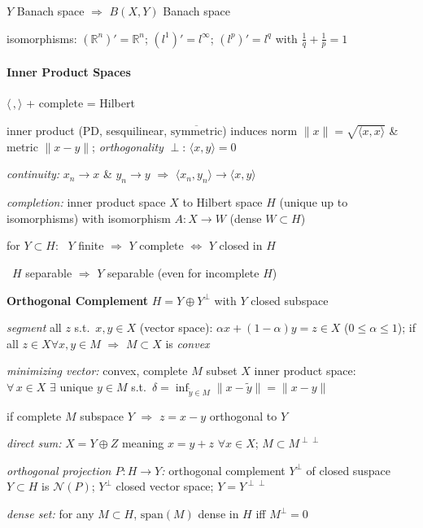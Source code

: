 \documentclass[8pt,twoside]{extarticle}
\begin{document}
\begin{multicols}{2}
$Y$ Banach space $\Rightarrow$ $B(X,Y)$ Banach space

isomorphisms: $(\mathbb{R}^n)'{=}\mathbb{R}^n$; $(l^1)'{=}l^\infty$; $(l^p)'{=}l^q$ with $\frac{1}{q}{+}\frac{1}{p}{=}1$

\paragraph{Inner Product Spaces} $\langle\,,\rangle$ + complete = Hilbert

inner product (PD, sesquilinear, $\overline{\text{symmetric}}$) induces norm $\|x\|=\sqrt{\langle x,x\rangle}$ \& metric $\|x-y\|$;
\textit{orthogonality} $\perp$: $\langle x,y\rangle=0$

\textit{continuity:} $x_n\to x$ \& $y_n\to y \,\,\Rightarrow\,\, \langle x_n,y_n\rangle\to\langle x,y\rangle$

\textit{completion:} inner product space $X$ to Hilbert space $H$ (unique up to isomorphisms) with isomorphism $A: X\to W$ (dense $W{\subset} H$)

for $Y{\subset} H$: \textbullet\ $Y$ finite $\Rightarrow$ $Y$ complete  $\Leftrightarrow$ $Y$ closed in $H$

\hspace{4.72em}\textbullet\ $H$ separable $\Rightarrow$ $Y$ separable (even for incomplete $H$)

\textbf{Orthogonal Complement} $H{=}Y{\oplus} Y^\perp$ with $Y$ closed subspace

\textit{segment} all $z$ s.t.\ $x,y\in X$ (vector space): $\alpha x{+}(1{-}\alpha)y=z{\in} X$ ($0{\leq}\alpha{\leq}1$); if all $z\in X \forall x,y\in M$ $\Rightarrow$ $M{\subset} X$ is \textit{convex}

\textit{minimizing vector:} convex, complete $M$ subset $X$ inner product space: $\forall \,x{\in} X \,\,\exists \text{ unique }y{\in} M$ s.t.\ $\delta=\inf
_{\tilde{y}\in M}\|x-\tilde{y}\|=\|x-y\|$

if complete $M$ subspace $Y$ $\Rightarrow$ $z{=}x{-}y$ orthogonal to $Y$

\textit{direct sum:} $X{=}Y{\oplus} Z$ meaning $x{=}y{+}z$ $\forall x\in X$; $M{\subset} M^{\perp\perp}$
 
 
\textit{orthogonal projection $P:H\to Y$:} orthogonal complement $Y^\perp$ of closed suspace $Y{\subset} H$ is $\mathscr{N}(P)$; $Y^\perp$ closed vector space; $Y{=} Y^{\perp\perp}$

\textit{dense set:} for any $M\subset H$, $\text{span}(M)$ dense in $H$ iff $M^\perp={0}$


\end{multicols}
\end{document}
